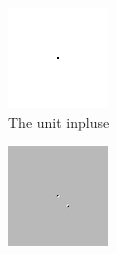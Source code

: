 \documentclass[
	12pt, %
]{style/fphw}
\begin{document}
\begin{figure}[H]
	\centering
	\begin{subfigure}[b]{.24\textwidth}
		\centering
		\includegraphics[width=0.9\linewidth]{test_input.png}
		\caption{The unit inpluse \\}
		\label{test_input}
	\end{subfigure}
	\hfill
	\begin{subfigure}[b]{.24\textwidth}
		\centering
		\includegraphics[width=0.9\linewidth]{test_input_burl.png}

\end{subfigure}
\end{figure}
\end{document}
